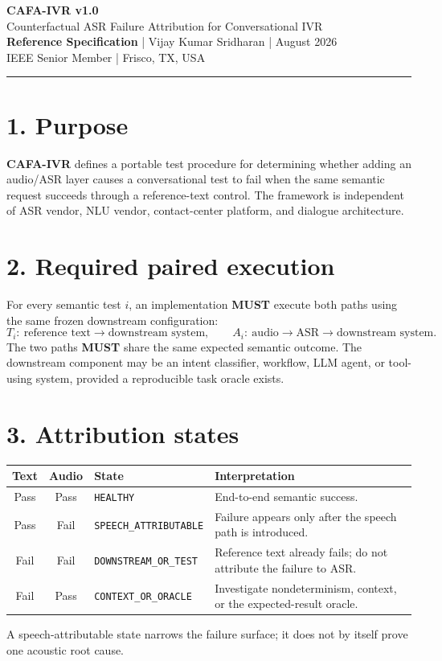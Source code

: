 \documentclass[10pt]{article}
\newcommand{\cafa}{\textbf{CAFA-IVR}}
\begin{document}
\begin{center}
{\LARGE\bfseries CAFA-IVR v1.0}\\[3pt]
{\large Counterfactual ASR Failure Attribution for Conversational IVR}\\[6pt]
\textbf{Reference Specification} \quad | \quad Vijay Kumar Sridharan \quad | \quad August 2026\\[2pt]
IEEE Senior Member \quad | \quad Frisco, TX, USA
\end{center}
\hrule

\section*{1. Purpose}
\cafa{} defines a portable test procedure for determining whether adding an audio/ASR layer causes a conversational test to fail when the same semantic request succeeds through a reference-text control. The framework is independent of ASR vendor, NLU vendor, contact-center platform, and dialogue architecture.

\section*{2. Required paired execution}
For every semantic test $i$, an implementation \textbf{MUST} execute both paths using the same frozen downstream configuration:
\[
T_i:\ \text{reference text}\rightarrow\text{downstream system},\qquad
A_i:\ \text{audio}\rightarrow\text{ASR}\rightarrow\text{downstream system}.
\]
The two paths \textbf{MUST} share the same expected semantic outcome. The downstream component may be an intent classifier, workflow, LLM agent, or tool-using system, provided a reproducible task oracle exists.

\section*{3. Attribution states}
\begin{center}
\begin{tabular}{cclp{2.7in}}
\toprule
Text & Audio & State & Interpretation\\
\midrule
Pass & Pass & \texttt{HEALTHY} & End-to-end semantic success.\\
Pass & Fail & \texttt{SPEECH\_ATTRIBUTABLE} & Failure appears only after the speech path is introduced.\\
Fail & Fail & \texttt{DOWNSTREAM\_OR\_TEST} & Reference text already fails; do not attribute the failure to ASR.\\
Fail & Pass & \texttt{CONTEXT\_OR\_ORACLE} & Investigate nondeterminism, context, or the expected-result oracle.\\
\bottomrule
\end{tabular}
\end{center}
A speech-attributable state narrows the failure surface; it does not by itself prove one acoustic root cause.
\end{document}
